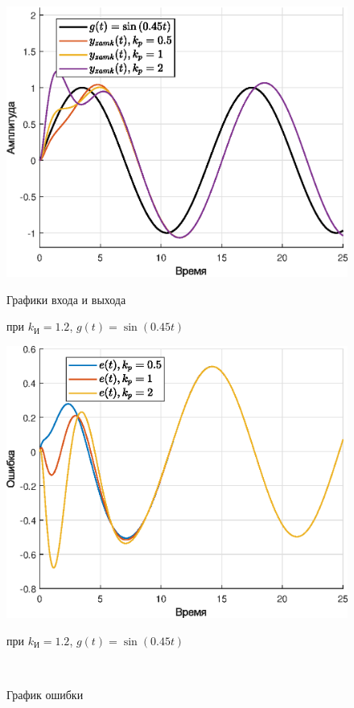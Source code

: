\documentclass[a4paper]{article}
\begin{document}
\begin{figure}[H]
    \begin{minipage}{0.5\textwidth}
        \centering \includegraphics[width=\textwidth]{ex5/ki_1.2_g_asinwt.eps}
        \caption{Графики входа и выхода}
        \centerline{при $k_{\text{И}} = 1.2$, $g(t) = \sin{(0.45t)}$}
    \end{minipage}\hfill
    \begin{minipage}{0.5\textwidth}
        \centering \includegraphics[width=\textwidth]{ex5/ki_1.2_g_asinwt_error.eps}
        \caption{График ошибки}
        \centerline{при $k_{\text{И}} = 1.2$, $g(t) = \sin{(0.45t)}$}
    \end{minipage}\\[1em]
\end{figure}\noindent\
\end{document}
